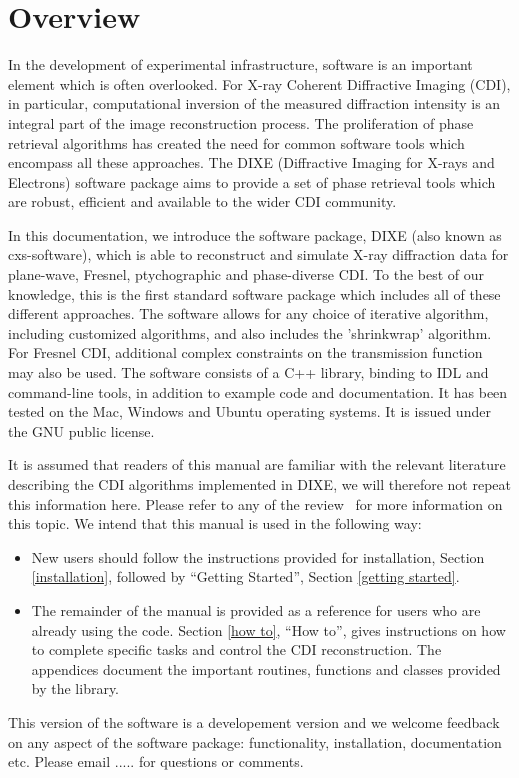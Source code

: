 \documentclass[]{cxs-software}
\begin{document}




\section{Overview}

In the development of experimental infrastructure, software is an
important element which is often overlooked. For X-ray Coherent
Diffractive Imaging (CDI), in particular, computational inversion of
the measured diffraction intensity is an integral part of the image
reconstruction process. The proliferation of phase retrieval
algorithms has created the need for common software tools which
encompass all these approaches. The DIXE (Diffractive Imaging for
X-rays and Electrons) software package aims to provide a set of phase
retrieval tools which are robust, efficient and available to the wider
CDI community.

In this documentation, we introduce the software package, DIXE (also
known as cxs-software), which is able to reconstruct and simulate
X-ray diffraction data for plane-wave, Fresnel, ptychographic and
phase-diverse CDI. To the best of our knowledge, this is the first
standard software package which includes all of these different
approaches. The software allows for any choice of iterative algorithm,
including customized algorithms, and also includes the 'shrinkwrap'
algorithm. For Fresnel CDI, additional complex constraints on the
transmission function may also be used. The software consists of a C++
library, binding to IDL and command-line tools, in addition to example
code and documentation. It has been tested on the Mac, Windows and
Ubuntu operating systems. It is issued under the GNU public license.

It is assumed that readers of this manual are familiar with the
relevant literature describing the CDI algorithms implemented in DIXE,
we will therefore not repeat this information here. Please refer to
any of the review~\cite{} for more information on this topic. We
intend that this manual is used in the following way:
\begin{itemize}
\item New users should follow the instructions provided for
  installation, Section \ref{installation}, followed by ``Getting
  Started'', Section \ref{getting started}.
\item The remainder of the manual is provided as a reference for users
  who are already using the code. Section \ref{how to}, ``How to'', gives
  instructions on how to complete specific tasks and control the CDI
  reconstruction. The appendices document the important routines,
  functions and classes provided by the \name library.
\end{itemize}
This version of the software is a developement version and we welcome
feedback on any aspect of the software package: functionality,
installation, documentation etc. Please email ..... for questions or
comments.
\end{document}
